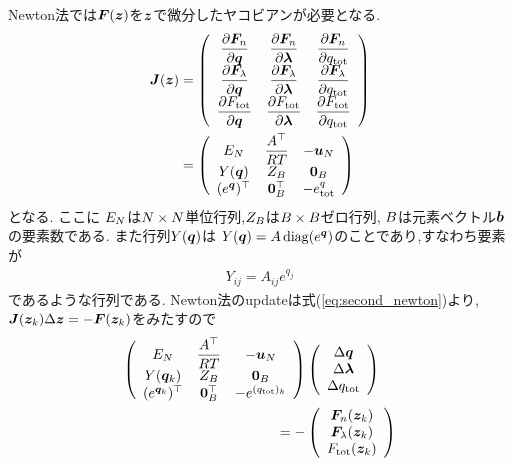 Newton法では$\boldsymbol{F} (\boldsymbol{z})$を$\boldsymbol{z}$で微分したヤコビアンが必要となる. 
\begin{align}
\label{eq:jacobian_tce}
\boldsymbol{J} (\boldsymbol{z}) &=
\left(
\begin{array}{ccc}
    \dfrac{\partial \boldsymbol{F}_n}{\partial \boldsymbol{q}}  & \dfrac{\partial \boldsymbol{F}_n}{\partial \boldsymbol{\lambda}}& \dfrac{\partial \boldsymbol{F}_n}{\partial q_\mathrm{tot}}\\ 
    \dfrac{\partial \boldsymbol{F}_\lambda}{\partial \boldsymbol{q}} & \dfrac{\partial \boldsymbol{F}_\lambda}{\partial \boldsymbol{\lambda}} & \dfrac{\partial \boldsymbol{F}_\lambda}{\partial q_\mathrm{tot}} \\
    \dfrac{\partial F_\mathrm{tot}}{\partial \boldsymbol{q}} & \dfrac{\partial F_\mathrm{tot}}{\partial \boldsymbol{\lambda}} & \dfrac{\partial F_\mathrm{tot}}{\partial q_\mathrm{tot}} \\  
\end{array}
\right) \nonumber \\
&=
\left(
\begin{array}{ccc}
 E_N &  \dfrac{A^\top}{RT} & - \boldsymbol{u}_N\\ 
 Y(\boldsymbol{q}) & Z_B & \boldsymbol{0}_B \\ 
 (e^{\boldsymbol{q}})^\top & \boldsymbol{0}_B^\top & - e^q_\mathrm{tot}\\  
\end{array}
\right)
\end{align}
となる. ここに
$E_N$は$N \times N$単位行列,$Z_B$は$B \times B$ゼロ行列, $B$は元素ベクトル$\boldsymbol{b}$の要素数である. また行列$Y(\boldsymbol{q})$は
$Y(\boldsymbol{q})= A \, \mathrm{diag}(e^{\boldsymbol{q}}) $のことであり,すなわち要素が
\begin{align}
Y_{ij} = A_{ij} e^{q_j}
\end{align}
であるような行列である. Newton法のupdateは式(\ref{eq:second_newton})より,$\boldsymbol{J} (\boldsymbol{z}_k) \Delta \boldsymbol{z} = - \boldsymbol{F} (\boldsymbol{z}_k)$をみたすので
\begin{align}
    \left(
\begin{array}{ccc}
 E_N &  \dfrac{A^\top}{RT} & - \boldsymbol{u}_N\\ 
 Y({\boldsymbol{q}}_k) & Z_B & \boldsymbol{0}_B \\ 
 (e^{{\boldsymbol{q}}_k})^\top & \boldsymbol{0}_B^\top & - e^{(q_\mathrm{tot})_k}\\  
\end{array}
\right)
    &\left(
\begin{array}{c}
\Delta \boldsymbol{q} \\
\Delta \boldsymbol{\lambda} \\
\Delta q_\mathrm{tot}
\end{array}
\right) \nonumber \\
= -
    &\left(
\begin{array}{c}
\boldsymbol{F}_n (\boldsymbol{z}_k) \\
\boldsymbol{F}_\lambda(\boldsymbol{z}_k) \\
F_\mathrm{tot} (\boldsymbol{z}_k)
\end{array}
\right)
\end{align}
